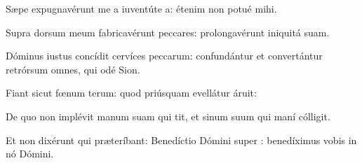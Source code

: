 \item {}

\item Sæpe expugnavérunt me a iuventúte a:\psstar{} étenim non potué mihi.

\item Supra dorsum meum fabricavérunt peccares:\psstar{} prolongavérunt iniquitá suam.

\item Dóminus iustus concídit cervíces peccarum:\psstar{} confundántur et convertántur retrórsum omnes, qui odé Sion.

\item Fiant sicut fœnum terum:\psstar{} quod priúsquam evellátur áruit:

\item De quo non implévit manum suam qui tit,\psstar{} et sinum suum qui maní cólligit.

\item Et non dixérunt qui præteríbant: Benedíctio Dómini super :\psstar{} benedíximus vobis in nó Dómini.

